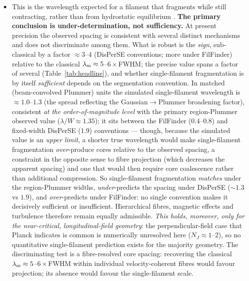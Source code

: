 \documentclass[usenatbib,twoside,twocolumn]{mnras}
\begin{document}
\begin{itemize}
\begin{itemize}
        \item This is the wavelength expected for a filament that fragments while still contracting, rather than from hydrostatic equilibrium \citep{Clarke2016}. \textbf{The primary conclusion is under-determination, not sufficiency.} At present precision the observed spacing is consistent with several distinct mechanisms and does not discriminate among them. What is robust is the \emph{sign}, sub-classical by a factor $\approx3$--$4$ (DisPerSE conventions; more under FilFinder) relative to the classical $\lambda_{\rm m}\approx5$--$6\times$FWHM; the precise value spans a factor of several (Table~\ref{tab:headline}), and whether single-filament fragmentation is by itself \emph{sufficient} depends on the segmentation convention. In matched (beam-convolved Plummer) units the simulated single-filament wavelength is $\approx1.0$--$1.3$ (the spread reflecting the Gaussian$\to$Plummer broadening factor), consistent \emph{at the order-of-magnitude level} with the primary region-Plummer observed value ($\lambda/W\approx1.35$); it sits between the FilFinder ($0.4$--$0.8$) and fixed-width DisPerSE ($1.9$) conventions --- though, because the simulated value is an \emph{upper limit}, a shorter true wavelength would make single-filament fragmentation \emph{over}-produce cores relative to the observed spacing, a constraint in the opposite sense to fibre projection (which decreases the apparent spacing) and one that would then require core coalescence rather than additional compression. So single-filament fragmentation \emph{matches} under the region-Plummer widths, \emph{under}-predicts the spacing under DisPerSE ($\sim1.3$ vs $1.9$), and \emph{over}-predicts under FilFinder: no single convention makes it decisively sufficient or insufficient. Hierarchical fibres, magnetic effects and turbulence therefore remain equally admissible. \emph{This holds, moreover, only for the near-critical, longitudinal-field geometry}: the perpendicular-field case that Planck indicates is common is numerically unresolved here ($N_J\approx1$--$2$), so no quantitative single-filament prediction exists for the majority geometry. The discriminating test is a fibre-resolved core spacing: recovering the classical $\lambda_{\rm m}\approx5$--$6\times$FWHM within individual velocity-coherent fibres would favour projection; its absence would favour the single-filament scale.
    \end{itemize}


\end{itemize}
\end{document}
